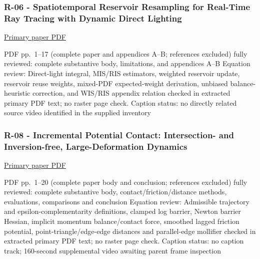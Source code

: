 \subsubsection{R-06 - Spatiotemporal Reservoir Resampling for Real-Time Ray Tracing with Dynamic Direct Lighting}\label{04-visual-computing-ii-ch036-r-06---spatiotemporal-reservoir-resampling-for-real-time-ray-tracing-with-dynamic-direct-lighting}

\hypertarget{04-visual-computing-ii-ch036-r-06---spatiotemporal-reservoir-resampling-for-real-time-ray-tracing-with-dynamic-direct-lighting}{}

\href{https://benedikt-bitterli.me/restir/bitterli20restir.pdf}{Primary paper PDF}

PDF pp.~1--17 (complete paper and appendices A--B; references excluded) fully reviewed: complete substantive body, limitations, and appendices A--B Equation review: Direct-light integral, MIS/RIS estimators, weighted reservoir update, reservoir reuse weights, mixed-PDF expected-weight derivation, unbiased balance-heuristic correction, and WIS/RIS appendix relation checked in extracted primary PDF text; no raster page check. Caption status: no directly related source video identified in the supplied inventory

\subsubsection{R-08 - Incremental Potential Contact: Intersection- and Inversion-free, Large-Deformation Dynamics}\label{04-visual-computing-ii-ch036-r-08---incremental-potential-contact-intersection--and-inversion-free-large-deformation-dynamics}

\hypertarget{04-visual-computing-ii-ch036-r-08---incremental-potential-contact-intersection--and-inversion-free-large-deformation-dynamics}{}

\href{https://ipc-sim.github.io/file/IPC-paper-350ppi.pdf}{Primary paper PDF}

PDF pp.~1--20 (complete paper body and conclusion; references excluded) fully reviewed: complete substantive body, contact/friction/distance methods, evaluations, comparisons and conclusion Equation review: Admissible trajectory and epsilon-complementarity definitions, clamped log barrier, Newton barrier Hessian, implicit momentum balance/contact force, smoothed lagged friction potential, point-triangle/edge-edge distances and parallel-edge mollifier checked in extracted primary PDF text; no raster page check. Caption status: no caption track; 160-second supplemental video awaiting parent frame inspection

